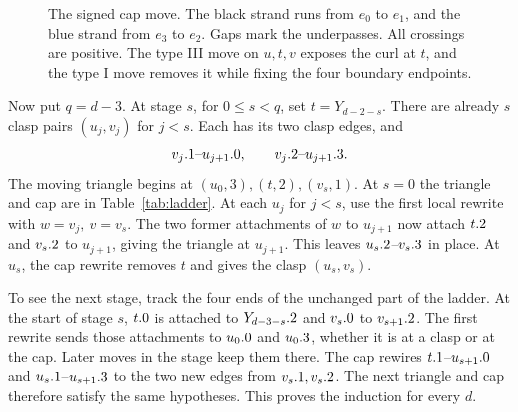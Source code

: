 \begin{figure}[htbp]
\caption{The signed cap move. The black strand runs from \(e_0\) to
\(e_1\), and the blue strand from \(e_3\) to \(e_2\). Gaps mark the
underpasses. All crossings are positive. The type III move on
\(u,t,v\) exposes the curl at \(t\), and the type I move removes it
while fixing the four boundary endpoints.}
\label{fig:cap}
\end{figure}

Now put \(q=d-3\). At stage \(s\), for \(0\le s<q\), set
\(t=Y_{d-2-s}\). There are already \(s\) clasp pairs
\((u_j,v_j)\) for \(j<s\). Each has its two clasp edges, and
\[
       v_j.1\text{--}u_{j+1}.0,\qquad
       v_j.2\text{--}u_{j+1}.3 .
\]
The moving triangle begins at \((u_0,3),(t,2),(v_s,1)\).
At \(s=0\) the triangle and cap are in Table~\ref{tab:ladder}.
At each \(u_j\) for \(j<s\), use the first local rewrite
with \(w=v_j,\ v=v_s\). The two former attachments of \(w\)
to \(u_{j+1}\) now attach \(t.2\) and \(v_s.2\)
to \(u_{j+1}\), giving the triangle at \(u_{j+1}\).
This leaves \(u_s.2\)--\(v_s.3\) in place.
At \(u_s\), the cap rewrite removes \(t\) and gives the
clasp \((u_s,v_s)\).

To see the next stage, track the four ends of the unchanged
part of the ladder. At the start of stage \(s\),
\(t.0\) is attached to \(Y_{d-3-s}.2\)
and \(v_s.0\) to \(v_{s+1}.2\).
The first rewrite sends those attachments to \(u_0.0\)
and \(u_0.3\), whether it is at a clasp or at the cap.
Later moves in the stage keep them there. The cap rewires
\(t.1\)--\(u_{s+1}.0\) and
\(u_s.1\)--\(u_{s+1}.3\)
to the two new edges from \(v_s.1,v_s.2\).
The next triangle and cap therefore satisfy the same
hypotheses. This proves the induction for every \(d\).

